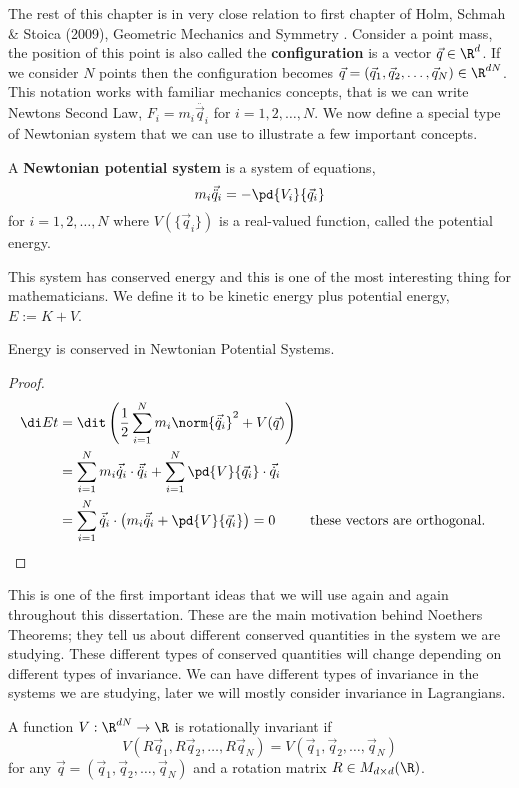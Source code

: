 \noindent
The rest of this chapter is in very close relation to first chapter of Holm, Schmah \& Stoica (2009), Geometric Mechanics and Symmetry \cite{holm_schmah_stoica_2009}. Consider a point mass, the position of this point is also called the \textbf{configuration} is a vector $\vec q \in \R^d$. If we consider $N$ points then the configuration becomes $\vec q = (\vec q_1, \vec q_2, \dots, \vec q_N) \in \R^{dN}$. This notation works with familiar mechanics concepts, that is we can write Newtons Second Law, $F_i = m_i\ddot{\vec q_i}$ for $i = 1, 2, \dots, N$.
We now define a special type of Newtonian system that we can use to illustrate a few important concepts.

\begin{ndefi}
  A \textbf{Newtonian potential system} is a system of equations,
  $$ m_i\vec{\ddot q}_i = -\pd{V_i}{\vec q_i} $$
  for $i = 1, 2, \dots, N$ where $V(\{\vec q_i\})$ is a real-valued function, called the potential energy.
\end{ndefi}
\noindent
This system has conserved energy and this is one of the most interesting thing for mathematicians. We define it to be kinetic energy plus potential energy, $E := K + V$.
\begin{nthm}
  Energy is conserved in Newtonian Potential Systems.
\end{nthm}
\begin{proof}
  \begin{align*}
    \di E t &= \dit \left( \frac{1}{2}\sum_{i=1}^N m_i\norm{\vec{\ddot q}_i}^2 + V(\vec q) \right)\\
    &= \sum_{i=1}^N m_i \vec{\dot q}_i \cdot \vec{\ddot q}_i + \sum_{i=1}^N \pd{V}{\vec q_i} \cdot \vec{\dot q}_i\\
    &= \sum_{i=1}^N \vec{\dot q}_i \cdot \left( m_i \vec{\ddot q}_i + \pd{V}{\vec q_i} \right) = 0 && \text{these vectors are orthogonal.}\\
  \end{align*}
\end{proof}

\noindent
This is one of the first important ideas that we will use again and again throughout this dissertation. These are the main motivation behind Noethers Theorems; they tell us about different conserved quantities in the system we are studying. These different types of conserved quantities will change depending on different types of invariance. We can have different types of invariance in the systems we are studying, later we will mostly consider invariance in Lagrangians.
\begin{ndefi}
  A function $V : \R^{dN} \to \R$ is rotationally invariant if
  $$ V(R\vec q_1, R\vec q_2, \dots, R\vec q_N) = V(\vec q_1, \vec q_2, \dots, \vec q_N) $$
  for any $\vec q = (\vec q_1, \vec q_2, \dots, \vec q_N)$ and a rotation matrix $R \in M_{d \times d}(\R)$.
\end{ndefi}


